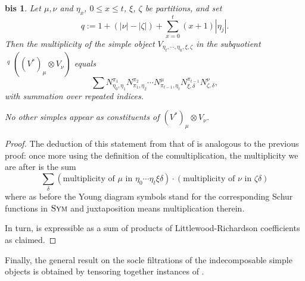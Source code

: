\documentclass[11pt]{article}
\theoremstyle{plain}
\theoremstyle{nonumberplain}
\newtheorem{qf'bis}{\Cref{le.quot_filt'} bis}
\theoremstyle{plain}
\theoremstyle{nonumberplain}
\newtheorem{proof}{Proof}
\DeclareMathOperator{\usoc}{\underline{\mathrm{soc}}}
\DeclareMathOperator{\sym}{\cat{Sym}}
\newcommand{\cat}[1]{\textsc{#1}}
\begin{document}
\begin{qf'bis}
Let $\mu,\nu$ and $\eta_x$, $0\le x\le t$, $\xi$, $\zeta$ be partitions, and set
\begin{equation*}
 q:=1+(|\nu|-|\zeta|)+\sum_{x=0}^{t}(x+1)|\eta_j|.
\end{equation*}
Then the multiplicity of the simple object
$
V_{\eta_t,\cdots,\eta_0,\xi,\zeta}
$
in the subquotient  $\usoc^q((V^*)_\mu\otimes V_\nu)$ equals
  \begin{equation*}
   \sum N_{\eta_0,\eta_1}^{\pi_1}N_{\pi_1,\eta_2}^{\pi_2}\cdots N_{\pi_{t-1},\eta_t}^{\mu}N_{\xi,\delta}^{\pi_{t-1}}N_{\zeta,\delta}^{\nu},
  \end{equation*}
with summation over repeated indices. 

No other simples appear as constituents of $(V^*)_\mu\otimes V_\nu$.
\end{qf'bis}
\begin{proof}
  The deduction of this statement from that of  is
  analogous to the previous proof: once more using the definition of
  the comultiplication, the multiplicity we are after is the sum
  \begin{equation}\label{eq:mults}
    \sum_\delta (\text{multiplicity of }\mu\text{ in }\eta_0\cdots\eta_t\xi\delta)\cdot (\text{multiplicity of }\nu\text{ in }\zeta\delta)
  \end{equation}
  where as before the Young diagram symbols stand for the
  corresponding Schur functions in $\sym$ and juxtaposition means
  multiplication therein.

  In turn,  is expressible as a sum of products of
  Littlewood-Richardson coefficients as claimed.
\end{proof}





Finally, the general result on the socle filtrations of the
indecomposable simple objects  is obtained by tensoring
together instances of .
\end{document}
